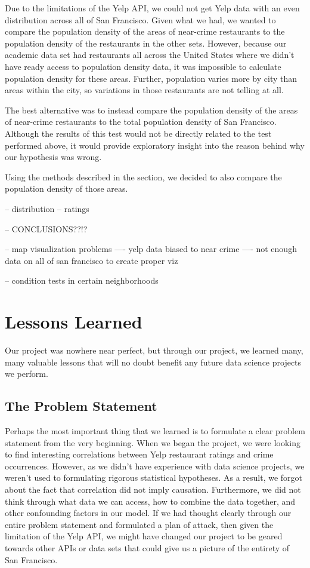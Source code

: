 \documentclass{article}
\begin{document}
Due to the limitations of the Yelp API, we could not get Yelp data with an
even distribution across all of San Francisco. Given what we had, we wanted
to compare the population density of the areas of near-crime restaurants to
the population density of the restaurants in the other sets. However,
because our academic data set had restaurants all across the United States
where we didn't have ready access to population density data, it was
impossible to calculate population density for these areas. Further,
population varies more by city than areas within the city, so variations in
those restaurants are not telling at all.

The best alternative was to instead compare the population density of the
areas of near-crime restaurants to the total population density of San
Francisco. Although the results of this test would not be directly related
to the test performed above, it would provide exploratory insight into the
reason behind why our hypothesis was wrong.

Using the methods described in the \textbf{} section,
we decided to also compare the population density of those areas.


-- distribution
-- ratings

-- CONCLUSIONS??!?

-- map visualization problems
---- yelp data biased to near crime
---- not enough data on all of san francisco to create proper viz

-- condition tests in certain neighborhoods

\section{Lessons Learned}
\label{sec:lessons-learned}

Our project was nowhere near perfect, but through our project, we learned
many, many valuable lessons that will no doubt benefit any future data
science projects we perform.

\subsection{The Problem Statement}

Perhaps the most important thing that we learned is to formulate a clear
problem statement from the very beginning. When we began the project, we
were looking to find interesting correlations between Yelp restaurant
ratings and crime occurrences. However, as we didn't have experience with
data science projects, we weren't used to formulating rigorous statistical
hypotheses. As a result, we forgot about the fact that correlation did not
imply causation. Furthermore, we did not think through what data we can
access, how to combine the data together, and other confounding factors in
our model. If we had thought clearly through our entire problem statement
and formulated a plan of attack, then given the limitation of the Yelp API,
we might have changed our project to be geared towards other APIs or data
sets that could give us a picture of the entirety of San Francisco.
\end{document}
